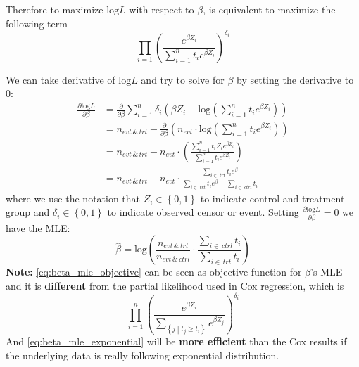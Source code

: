 \documentclass[a4paper,12pt]{article}
\begin{document}
Therefore to maximize $\mathrm{log}L$ with respect to $\beta$, is equivalent to maximize the following term
\begin{equation}
  \label{eq:beta_mle_objective}
  \prod\limits_{i = 1}\left(
    \frac{e^{\beta Z_i}}{\sum\limits_{i = 1}^nt_ie^{\beta Z_i}}
  \right)^{\delta_i}
\end{equation}

We can take derivative of $\mathrm{log}L$ and try to solve for $\beta$ by setting the derivative to 0:
\[
  \begin{aligned}
    \frac{\partial \mathrm{log}L}{\partial \beta}
    &= \frac{\partial}{\partial\beta}
      \sum\limits_{i = 1}^n\delta_i\left(
      \beta Z_i - \mathrm{log}\left(\sum\limits_{i = 1}^nt_ie^{\beta Z_i}\right)
      \right)    \\
    &= n_{evt \,\&\, trt}
      - \frac{\partial}{\partial\beta}
      \left(n_{evt} \cdot
      \mathrm{log}\left(\sum\limits_{i = 1}^nt_ie^{\beta Z_i}\right)
      \right)    \\
    &= n_{evt\,\&\,trt}
      - n_{evt}\cdot \left(
      \frac{\sum\limits_{i = 1}^nt_iZ_ie^{\beta Z_i}}{\sum\limits_{i = 1}^nt_ie^{\beta Z_i}}
      \right)    \\
    &= n_{evt\,\&\,trt}
      - n_{evt} \cdot
      \frac{\sum\limits_{i\in\;trt}t_ie^{\beta}}{
      \sum\limits_{i\in\;trt}t_ie^{\beta} + \sum\limits_{i\in\;ctrl}t_i}
  \end{aligned}
\]
where we use the notation that $Z_i\in\left\{0, 1\right\}$ to indicate control and treatment group and $\delta_i\in\left\{0, 1\right\}$ to indicate observed censor or event. Setting $\frac{\partial\mathrm{log}L}{\partial \beta} = 0$ we have the MLE:
\begin{equation}
  \label{eq:beta_mle_exponential}
  \hat{\beta} = \mathrm{log}\left(
    \frac{n_{evt\,\&\,trt}}{n_{evt\,\&\,ctrl}}
    \cdot
    \frac{\sum\limits_{i\in\,ctrl}t_i}{\sum\limits_{i\in\,trt}t_i}
  \right)
\end{equation}
\textbf{Note:} \eqref{eq:beta_mle_objective} can be seen as objective function for $\beta$'s MLE and it is \textbf{different} from the partial likelihood used in Cox regression, which is
\[
  \prod\limits_{i = 1}^n\left(
    \frac{e^{\beta Z_i}}{\sum\limits_{\left\{j\middle|t_j\geq t_i\right\}}e^{\beta Z_j}}
  \right)^{\delta_i}
\]
And \eqref{eq:beta_mle_exponential} will be \textbf{more efficient} than the Cox results if the underlying data is really following exponential distribution. 
\end{document}
